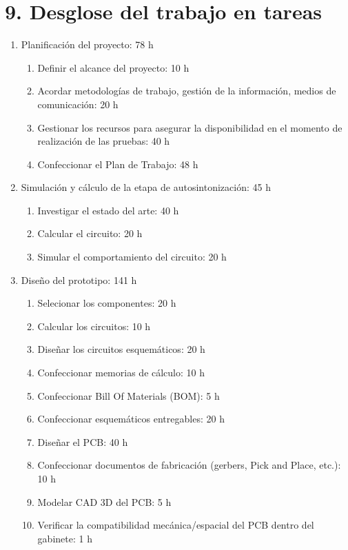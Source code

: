 \documentclass[
11pt, %
]{charter}
\begin{document}
\section{9. Desglose del trabajo en tareas}
\label{sec:wbs}

\begin{enumerate}
\item Planificación del proyecto: 78 h
	\begin{enumerate}
	\item Definir el alcance del proyecto: 10 h
	\item Acordar metodologías de trabajo, gestión de la información, medios de comunicación: 20 h
	\item Gestionar los recursos para asegurar la disponibilidad en el momento de realización de las pruebas: 40 h
	\item Confeccionar el Plan de Trabajo: 48 h
	\end{enumerate}

\item Simulación y cálculo de la etapa de autosintonización: 45 h
	\begin{enumerate}
	\item Investigar el estado del arte: 40 h
	\item Calcular el circuito: 20 h
	\item Simular el comportamiento del circuito: 20 h 
	\end{enumerate}
	
\item Diseño del prototipo: 141 h
	\begin{enumerate}
	\item Selecionar los componentes: 20 h
	\item Calcular los circuitos: 10 h
	\item Diseñar los circuitos esquemáticos: 20 h
	\item Confeccionar memorias de cálculo: 10 h
	\item Confeccionar Bill Of Materials (BOM): 5 h
	\item Confeccionar esquemáticos entregables: 20 h
	\item Diseñar el PCB: 40 h
	\item Confeccionar documentos de fabricación (gerbers, Pick and Place, etc.): 10 h
	\item Modelar CAD 3D del PCB: 5 h
	\item Verificar la compatibilidad mecánica/espacial del PCB dentro del gabinete: 1 h
	\end{enumerate}
	

\end{enumerate}
\end{document}
